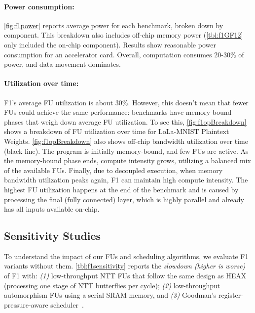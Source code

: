 \figFOneDataMovement
\figFOneOpBreakdown

\paragraph{Power consumption:}
\autoref{fig:f1power} reports average power for each benchmark, broken down by
component. This breakdown also includes off-chip memory power
(\autoref{tbl:f1GF12} only included the on-chip component). Results show
reasonable power consumption for an accelerator card. Overall, computation
consumes 20-30\% of power, and data movement dominates.

\paragraph{Utilization over time:}
F1's average FU utilization is about 30\%. However, this doesn't mean that
fewer FUs could achieve the same performance: benchmarks have memory\hyp{}bound
phases that weigh down average FU utilization. To see this,
\autoref{fig:f1opBreakdown} shows a breakdown of FU utilization over time for
LoLa-MNIST Plaintext Weights. \autoref{fig:f1opBreakdown} also shows off-chip
bandwidth utilization over time (black line). The program is initially
memory-bound, and few FUs are active. As the memory-bound phase ends, compute
intensity grows, utilizing a balanced mix of the available FUs. Finally, due to
decoupled execution, when memory bandwidth utilization peaks again, F1 can
maintain high compute intensity. The highest FU utilization happens at the end
of the benchmark and is caused by processing the final (fully connected) layer,
which is highly parallel and already has all inputs available on-chip.

\subsection{Sensitivity Studies}
\label{sec:f1_sensitivity}

\tblFOneSensitivity

To understand the impact of our FUs and scheduling algorithms, we evaluate F1
variants without them. \autoref{tbl:f1sensitivity} reports the \emph{slowdown
(higher is worse)} of F1 with: \emph{(1)} low\hyp{}throughput NTT FUs that
follow the same design as HEAX (processing one stage of NTT butterflies per
cycle); \emph{(2)} low\hyp{}throughput automorphism FUs using a serial SRAM
memory, and \emph{(3)} Goodman's register-pressure-aware
scheduler~\cite{goodman:ics1988:code}.


